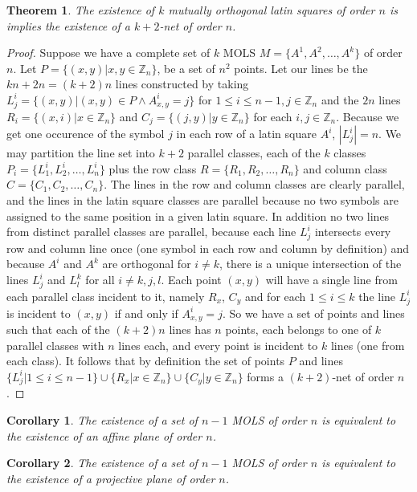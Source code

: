 \documentclass{article}
\newtheorem{theorem}{Theorem}
\newtheorem{corollary}{Corollary}
\begin{document}
      \begin{theorem}\label{thm:mols-to-net}
        The existence of \(k\) mutually orthogonal latin squares of order \(n\) is implies the existence of a \(k + 2\)-net of order \(n\).
      \end{theorem}
      \begin{proof}
        Suppose we have a complete set of \(k\) MOLS \(M = \{A^{1}, A^{2}, \ldots, A^{k}\}\) of order \(n\). Let \(P = \{(x, y) | x, y \in \mathbb{Z}_{n}\}\), be a set of \(n^{2}\) points. Let our lines be the \(kn + 2n = (k + 2)n\) lines constructed by taking \(L_{j}^{i} = \{(x, y) | (x, y) \in P \land A^{i}_{x,y} = j\}\) for \(1 \le i \le n - 1, j \in \mathbb{Z}_{n}\) and the \(2n\) lines \(R_{i} = \{(x, i) | x \in \mathbb{Z}_{n}\}\) and \(C_{j} = \{(j, y) | y \in \mathbb{Z}_{n}\}\) for each \(i, j \in \mathbb{Z}_{n}\). Because we get one occurence of the symbol \(j\) in each row of a latin square \(A^{i}\), \(|L_{j}^{i}| = n\). We may partition the line set into \(k + 2\) parallel classes, each of the \(k\) classes \(P_{i} = \{L_{1}^{i}, L_{2}^{i}, \ldots, L_{n}^{i}\}\) plus the row class \(R = \{R_{1}, R_{2}, \ldots, R_{n}\}\) and column class \(C = \{C_{1}, C_{2}, \ldots, C_{n}\}\). The lines in the row and column classes are clearly parallel, and the lines in the latin square classes are parallel because no two symbols are assigned to the same position in a given latin square. In addition no two lines from distinct parallel classes are parallel, because each line \(L_{j}^{i}\) intersects every row and column line once (one symbol in each row and column by definition) and because \(A^{i}\) and \(A^{k}\) are orthogonal for \(i \neq k\), there is a unique intersection of the lines \(L^{i}_{j}\) and \(L^{k}_{l}\) for all \(i \ne k, j, l\). Each point \((x, y)\) will have a single line from each parallel class incident to it, namely \(R_{x}\), \(C_{y}\) and for each \(1 \le i \le k\) the line \(L^{i}_{j}\) is incident to \((x, y)\) if and only if \(A^{i}_{x, y} = j\). So we have a set of points and lines such that each of the \((k + 2)n\) lines has \(n\) points, each belongs to one of \(k\) parallel classes with \(n\) lines each, and every point is incident to \(k\) lines (one from each class). It follows that by definition the set of points \(P\) and lines \(\{L_{j}^{i} | 1 \le i \le n - 1\} \cup \{R_{x} | x \in \mathbb{Z}_{n}\} \cup \{C_{y} | y \in \mathbb{Z}_{n}\}\) forms a \((k + 2)\)-net of order \(n\).
      \end{proof}

      \begin{corollary}
        The existence of a set of \(n - 1\) MOLS of order \(n\) is equivalent to the existence of an affine plane of order \(n\).
      \end{corollary}
      \begin{corollary}\label{cor:proj-MOLS}
        The existence of a set of \(n - 1\) MOLS of order \(n\) is equivalent to the existence of a projective plane of order \(n\).
      \end{corollary}
\end{document}
